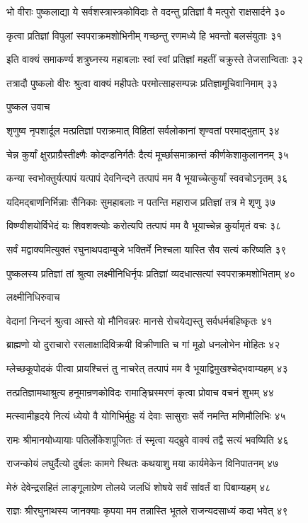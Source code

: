 भो वीराः पुष्कलाद्या ये सर्वशस्त्रास्त्रकोविदाः
ते वदन्तु प्रतिज्ञां वै मत्पुरो राक्षसार्दने ३०

कृत्वा प्रतिज्ञां विपुलां स्वपराक्रमशोभिनीम्
गच्छन्तु रणमध्ये हि भवन्तो बलसंयुताः ३१

इति वाक्यं समाकर्ण्य शत्रुघ्नस्य महाबलाः
स्वां स्वां प्रतिज्ञां महतीं चक्रुस्ते तेजसान्विताः ३२

तत्रादौ पुष्कलो वीरः श्रुत्वा वाक्यं महीपतेः
परमोत्साहसम्पन्नः प्रतिज्ञामूचिवानिमाम् ३३

पुष्कल उवाच

शृणुष्व नृपशार्दूल मत्प्रतिज्ञां पराक्रमात्
विहितां सर्वलोकानां शृण्वतां परमाद्भुताम् ३४

चेन्न कुर्यां क्षुरप्राग्रैस्तीक्ष्णैः कोदण्डनिर्गतैः
दैत्यं मूर्च्छासमाक्रान्तं कीर्णकेशाकुलाननम् ३५

कन्या स्वभोक्तुर्यत्पापं यत्पापं देवनिन्दने
तत्पापं मम वै भूयाच्चेत्कुर्यां स्ववचोऽनृतम् ३६

यदिमद्बाणनिर्भिन्नाः सैनिकाः सुमहाबलाः
न पतन्ति महाराज प्रतिज्ञां तत्र मे शृणु ३७

विष्ण्वीशयोर्विभेदं यः शिवशक्त्योः करोत्यपि
तत्पापं मम वै भूयाच्चेन्न कुर्यामृतं वचः ३८

सर्वं मद्वाक्यमित्युक्तं रघुनाथपदाम्बुजे
भक्तिर्मे निश्चला यास्ति सैव सत्यं करिष्यति ३९

पुष्कलस्य प्रतिज्ञां तां श्रुत्वा लक्ष्मीनिधिर्नृपः
प्रतिज्ञां व्यदधात्सत्यां स्वपराक्रमशोभिताम् ४०

लक्ष्मीनिधिरुवाच

वेदानां निन्दनं श्रुत्वा आस्ते यो मौनिवन्नरः
मानसे रोचयेद्यस्तु सर्वधर्मबहिष्कृतः ४१

ब्राह्मणो यो दुराचारो रसलाक्षादिविक्रयी
विक्रीणाति च गां मूढो धनलोभेन मोहितः ४२

म्लेच्छकूपोदकं पीत्वा प्रायश्चित्तं तु नाचरेत्
तत्पापं मम वै भूयाद्विमुखश्चेद्भवाम्यहम् ४३

तत्प्रतिज्ञामथाश्रुत्य हनूमान्रणकोविदः
रामाङ्घ्रिस्मरणं कृत्वा प्रोवाच वचनं शुभम् ४४

मत्स्वामीहृदये नित्यं ध्येयो वै योगिभिर्मुहुः
यं देवाः सासुराः सर्वे नमन्ति मणिमौलिभिः ४५

रामः श्रीमानयोध्यायाः पतिर्लोकेशपूजितः
तं स्मृत्वा यद्ब्रुवे वाक्यं तद्वै सत्यं भवष्यिति ४६

राजन्कोयं लघुर्दैत्यो दुर्बलः कामगे स्थितः
कथयाशु मया कार्यमेकेन विनिपातनम् ४७

मेरुं देवेन्द्रसहितं लाङ्गूलाग्रेण तोलये
जलधिं शोषये सर्वं सांवर्तं वा पिबाम्यहम् ४८

राज्ञः श्रीरघुनाथस्य जानक्याः कृपया मम
तन्नास्ति भूतले राजन्यदसाध्यं कदा भवेत् ४९

